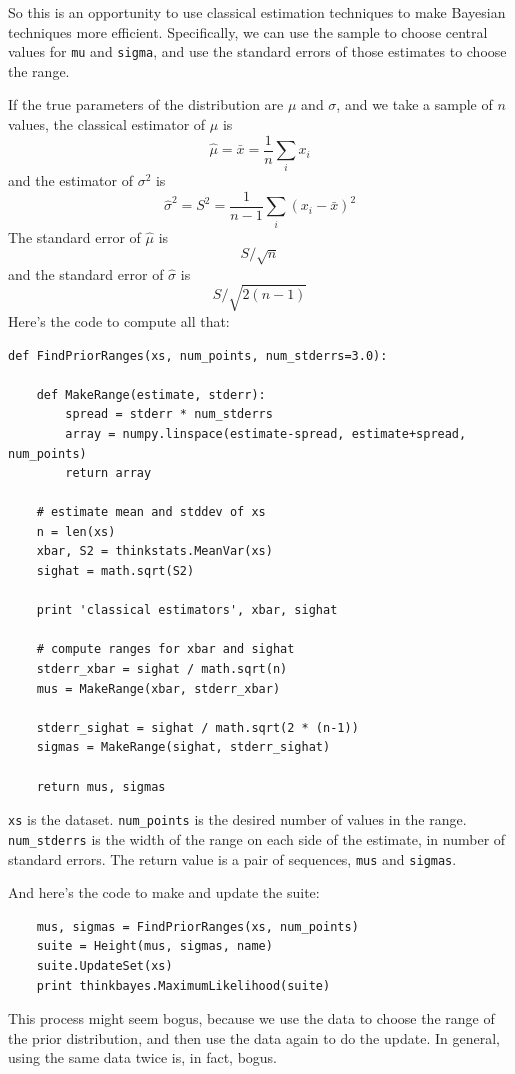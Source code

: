 \documentclass[12pt]{book}
\begin{document}
So this is an opportunity to use classical estimation techniques to
make Bayesian techniques more efficient.  Specifically, we can use the
sample to choose central values for {\tt mu} and {\tt sigma}, and use
the standard errors of those estimates to choose the range.

If the true parameters of the distribution are $\mu$ and
$\sigma$, and we take a sample of $n$ values, the classical estimator
of $\mu$ is
%
\[ \hat{\mu} = \bar{x} = \frac{1}{n} \sum_i x_i \]
%
and the estimator of $\sigma^2$ is
%
\[ \hat{\sigma}^2 = S^2 = \frac{1}{n-1} \sum_i (x_i - \bar{x})^2 \]
%
The standard error of $\hat{\mu}$ is
%
\[ S / \sqrt{n} \]
%
and the standard error of $\hat{\sigma}$ is
%
\[ S / \sqrt{2 (n-1)}\]
%
Here's the code to compute all that:

\begin{verbatim}
def FindPriorRanges(xs, num_points, num_stderrs=3.0):

    def MakeRange(estimate, stderr):
        spread = stderr * num_stderrs
        array = numpy.linspace(estimate-spread, estimate+spread, num_points)
        return array

    # estimate mean and stddev of xs
    n = len(xs)
    xbar, S2 = thinkstats.MeanVar(xs)
    sighat = math.sqrt(S2)

    print 'classical estimators', xbar, sighat

    # compute ranges for xbar and sighat
    stderr_xbar = sighat / math.sqrt(n)
    mus = MakeRange(xbar, stderr_xbar)

    stderr_sighat = sighat / math.sqrt(2 * (n-1))
    sigmas = MakeRange(sighat, stderr_sighat)

    return mus, sigmas
\end{verbatim}

{\tt xs} is the dataset.  \verb"num_points" is the desired number of
values in the range.  \verb"num_stderrs" is the width of the range on
each side of the estimate, in number of standard errors.  The return
value is a pair of sequences, {\tt mus} and {\tt sigmas}.

And here's the code to make and update the suite:

\begin{verbatim}
    mus, sigmas = FindPriorRanges(xs, num_points)
    suite = Height(mus, sigmas, name)
    suite.UpdateSet(xs)
    print thinkbayes.MaximumLikelihood(suite)    
\end{verbatim}

This process might seem bogus, because we 
use the data to choose the range of the prior distribution, and then
use the data again to do the update.  In general, using the same
data twice is, in fact, bogus.
\end{document}
